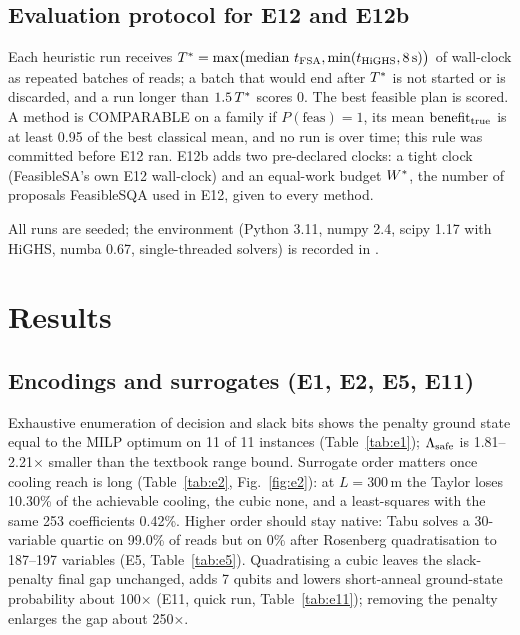\documentclass[conference]{IEEEtran}
\begin{document}
\subsection{Evaluation protocol for E12 and E12b}
Each heuristic run receives $\Tstar=\max\bigl(\mathrm{median}\ t_{\mathrm{FSA}},\min(t_{\mathrm{HiGHS}},8\,\mathrm{s})\bigr)$ of
wall-clock as repeated batches of reads; a batch that would end after $T^{\ast}$ is not started or is
discarded, and a run longer than $1.5\,T^{\ast}$ scores 0. The best feasible plan is scored. A method
is COMPARABLE on a family if $P(\mathrm{feas})=1$, its mean $\mathrm{benefit}_{\mathrm{true}}$ is at least 0.95 of the best
classical mean, and no run is over time; this rule was committed before E12 ran. E12b adds two
pre-declared clocks: a tight clock (FeasibleSA's own E12 wall-clock) and an equal-work budget
$W^{\ast}$, the number of proposals FeasibleSQA used in E12, given to every method.

All runs are seeded; the environment (Python 3.11, numpy 2.4, scipy 1.17 with HiGHS, numba 0.67,
single-threaded solvers) is recorded in .

\section{Results}\label{sec:results}
\subsection{Encodings and surrogates (E1, E2, E5, E11)}
Exhaustive enumeration of decision and slack bits shows the penalty \QUBO{} ground state equal to the
MILP optimum on 11 of 11 instances (Table~\ref{tab:e1}); $\Lambda_{\mathrm{safe}}$ is 1.81--2.21$\times$ smaller than
the textbook range bound. Surrogate order matters once cooling reach is long (Table~\ref{tab:e2},
Fig.~\ref{fig:e2}): at $L=300$\,m the Taylor \QUBO{} loses 10.30\% of the achievable cooling, the
cubic \HUBO{} none, and a least-squares \QUBO{} with the same 253 coefficients 0.42\%. Higher order
should stay native: Tabu solves a 30-variable quartic \HUBO{} on 99.0\% of reads but on 0\% after
Rosenberg quadratisation to 187--197 variables (E5, Table~\ref{tab:e5}). Quadratising a cubic
\HUBO{} leaves the slack-penalty final gap unchanged, adds 7 qubits and lowers short-anneal
ground-state probability about 100$\times$ (E11, quick run, Table~\ref{tab:e11}); removing the
penalty enlarges the gap about 250$\times$.
\end{document}
